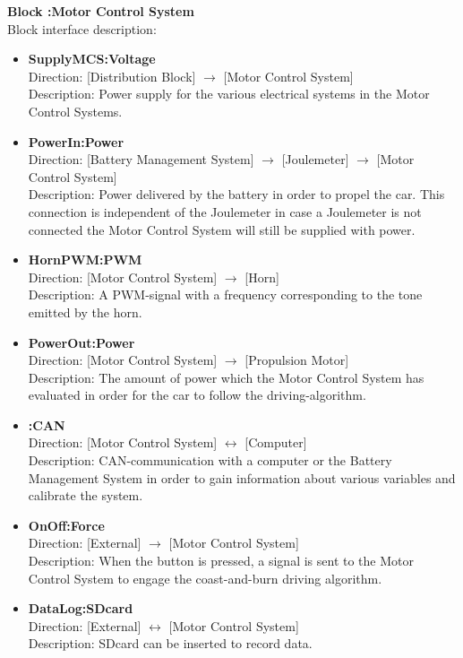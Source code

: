 \textbf{Block :Motor Control System}\\
Block interface description:
\begin{itemize}
	\item \textbf{SupplyMCS:Voltage}\\
	Direction: [Distribution Block] $\rightarrow$ [Motor Control System]\\
	Description: Power supply for the various electrical systems in the Motor Control Systems.
	\item \textbf{PowerIn:Power}\\
	Direction: [Battery Management System] $\rightarrow$ [Joulemeter] $\rightarrow$ [Motor Control System]\\
	Description: Power delivered by the battery in order to propel the car. This connection is independent of the Joulemeter in case a Joulemeter is not connected the Motor Control System will still be supplied with power.
	\item \textbf{HornPWM:PWM}\\
	Direction: [Motor Control System] $\rightarrow$ [Horn]\\
	Description: A PWM-signal with a frequency corresponding to the tone emitted by the horn.
	\item \textbf{PowerOut:Power}\\
	Direction: [Motor Control System] $\rightarrow$ [Propulsion Motor]\\
	Description: The amount of power which the Motor Control System has evaluated in order for the car to follow the driving-algorithm.
	\item \textbf{:CAN}\\
	Direction: [Motor Control System] $\leftrightarrow$ [Computer]\\
	Description: CAN-communication with a computer or the Battery Management System in order to gain information about various variables and calibrate the system.
	\item \textbf{OnOff:Force}\\
	Direction: [External] $\rightarrow$ [Motor Control System]\\
	Description: When the button is pressed, a signal is sent to the Motor Control System to engage the coast-and-burn driving algorithm.
	\item \textbf{DataLog:SDcard}\\
	Direction: [External] $\leftrightarrow$ [Motor Control System]\\
	Description: SDcard can be inserted to record data.
\end{itemize}

